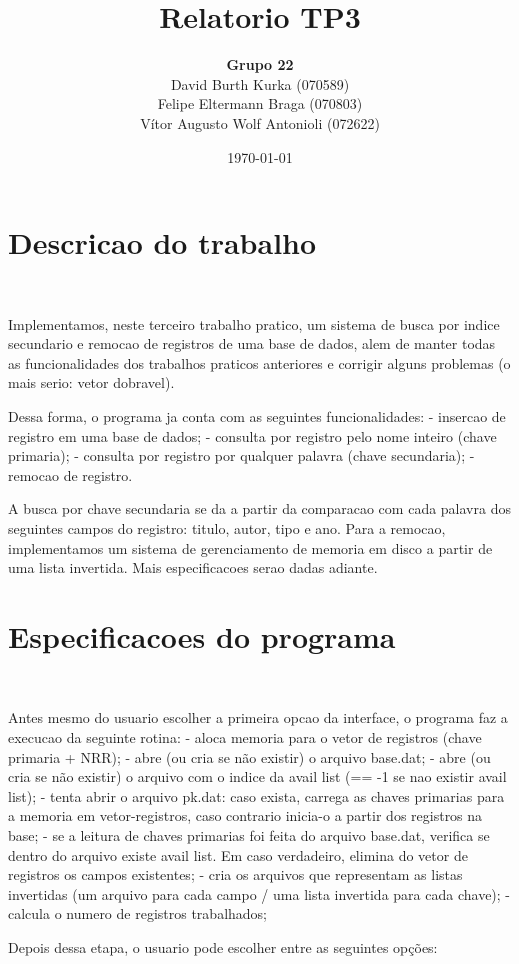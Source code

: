 \documentclass{article}
\title{\textbf{Relatorio TP3}}
\author{\textbf{Grupo 22} \\
  David Burth Kurka (070589) \\
  Felipe Eltermann Braga (070803) \\
  Vítor Augusto Wolf Antonioli (072622)}
\date{\today}
\begin{document}
\maketitle

\section{Descricao do trabalho}\

Implementamos, neste terceiro trabalho pratico, um sistema de busca por indice secundario e remocao de registros de uma base de dados, alem de manter todas as funcionalidades dos trabalhos praticos anteriores e corrigir alguns problemas (o mais serio: vetor dobravel).

Dessa forma, o programa ja conta com as seguintes funcionalidades: 
- insercao de registro em uma base de dados; 
- consulta por registro pelo nome inteiro (chave primaria); 
- consulta por registro por qualquer palavra (chave secundaria); 
- remocao de registro.

A busca por chave secundaria se da a partir da comparacao com cada palavra dos seguintes campos do registro: titulo, autor, tipo e ano. Para a remocao, implementamos um sistema de gerenciamento de memoria em disco a partir de uma lista invertida. Mais especificacoes serao dadas adiante.

\section{Especificacoes do programa}\

Antes mesmo do usuario escolher a primeira opcao da interface, o programa faz a execucao da seguinte rotina: 
- aloca memoria para o vetor de registros (chave primaria + NRR); 
- abre (ou cria se não existir) o arquivo base.dat;
- abre (ou cria se não existir) o arquivo com o indice da avail list (== -1 se nao existir avail list);
- tenta abrir o arquivo pk.dat: caso exista, carrega as chaves primarias para a memoria em vetor-registros, caso contrario inicia-o a partir dos registros na base;
- se a leitura de chaves primarias foi feita do arquivo base.dat, verifica se dentro do arquivo existe avail list. Em caso verdadeiro, elimina do vetor de registros os campos existentes;
- cria os arquivos que representam as listas invertidas (um arquivo para cada campo / uma lista invertida para cada chave);
- calcula o numero de registros trabalhados;


Depois dessa etapa, o usuario pode escolher entre as seguintes opções:
\end{document}
